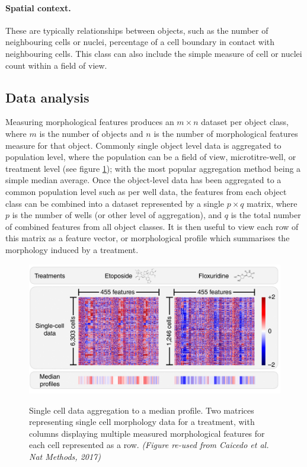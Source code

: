 \documentclass[a4paper,11pt,twoside,openright]{scrbook}
\begin{document}
\paragraph{Spatial context.}
These are typically relationships between objects, such as the number of neighbouring cells or nuclei, percentage of a 
cell boundary in contact with neighbouring cells. This class can also include the simple measure of cell or nuclei 
count within a field of view.


\subsection{Data analysis}

Measuring morphological features produces an $m \times n$ dataset per object class, where $m$ is the number of objects 
and $n$ is the number of morphological features measure for that object.
Commonly single object level data is aggregated to population level, where the population can be a field of view, 
microtitre-well, or treatment level (see figure \ref{figure:aggregation}); with the most popular aggregation method 
being a simple median average. \cite{Caicedo2017}
Once the object-level data has been aggregated to a common population level such as per well data, the features from 
each object class can be combined into a dataset represented by a single $p \times q$ matrix, where $p$ is the number 
of wells (or other level of aggregation), and $q$ is the total number of combined features from all object classes.
It is then useful to view each row of this matrix as a feature vector, or morphological profile which summarises the 
morphology induced by a treatment.

\begin{figure}
    \captionsetup{width=0.8\textwidth}
    \caption[Single cell aggregation to a median profile]{Single cell data aggregation to a median profile. Two 
matrices representing single cell morphology data for a treatment, with columns displaying multiple measured 
morphological features for each cell represented as a row. \textit{(Figure re-used from Caicedo et al. Nat Methods, 
2017)}}
    \includegraphics[width=0.8\linewidth]{figs/ch1SingleCellAggregation}
    \label{figure:aggregation}
\end{figure}
\end{document}
